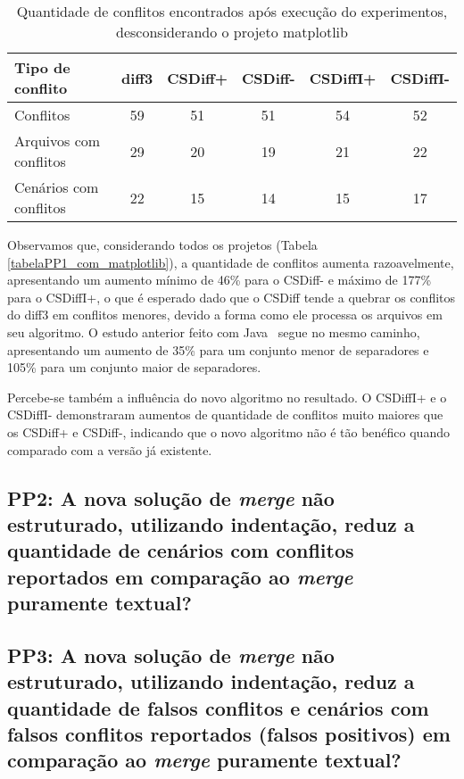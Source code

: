 \begin{table}[ht]
	\begin{center}
		\begin{tabular}{|l|c|c|c|c|c|}
			\hline
			\textbf{Tipo de conflito} & \textbf{diff3} & \textbf{CSDiff+} & \textbf{CSDiff-} & \textbf{CSDiffI+} & \textbf{CSDiffI-} \\
			\hline
			Conflitos                 & 59             & 51               & 51               & 54                & 52                \\
			Arquivos com conflitos    & 29             & 20               & 19               & 21                & 22                \\
			Cenários com conflitos    & 22             & 15               & 14               & 15                & 17                \\
			\hline
		\end{tabular}
	\end{center}
	\caption{Quantidade de conflitos encontrados após execução do experimentos, desconsiderando o projeto matplotlib}\label{tabelaPP1_sem_matplotlib}
\end{table}

Observamos que, considerando todos os projetos (Tabela \ref{tabelaPP1_com_matplotlib}), a quantidade de conflitos aumenta
razoavelmente, apresentando um aumento mínimo de 46\% para o CSDiff- e máximo de 177\% para o CSDiffI+, o que é esperado dado que o
CSDiff tende a quebrar os conflitos do diff3 em conflitos menores, devido a forma como ele processa os arquivos em seu algoritmo.
O estudo anterior feito com Java~\cite{clem21} segue no mesmo caminho, apresentando um aumento de 35\% para um conjunto menor de
separadores e 105\% para um conjunto maior de separadores.

Percebe-se também a influência do novo algoritmo no resultado. O CSDiffI+ e o CSDiffI- demonstraram aumentos de quantidade de
conflitos muito maiores que os CSDiff+ e CSDiff-, indicando que o novo algoritmo não é tão benéfico quando comparado com a
versão já existente.

\subsection{PP2: A nova solução de \emph{merge} não estruturado, utilizando indentação,
	reduz a quantidade de cenários com conflitos reportados em comparação ao \emph{merge} puramente textual?}
\subsection{PP3: A nova solução de \emph{merge} não estruturado, utilizando indentação,
	reduz a quantidade de falsos conflitos e cenários com falsos conflitos reportados
	(falsos positivos) em comparação ao \emph{merge} puramente textual?}

